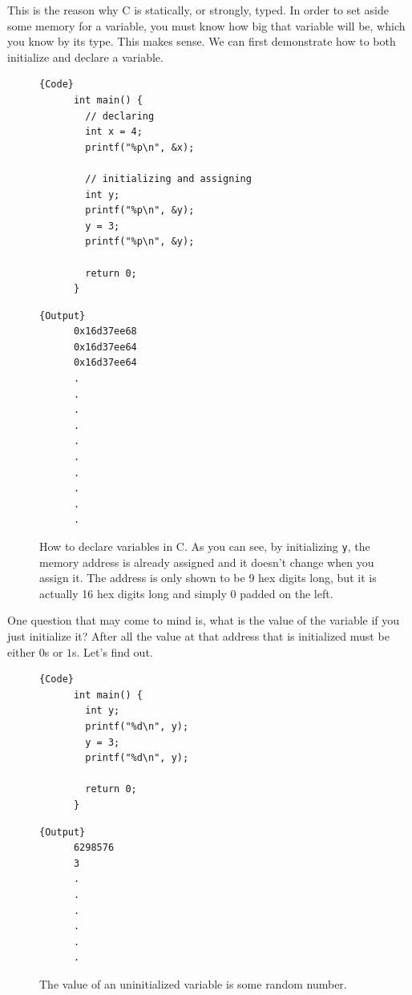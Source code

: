 \documentclass{article}
\begin{document}
  This is the reason why C is statically, or strongly, typed. In order to set aside some memory for a variable, you must know how big that variable will be, which you know by its type. This makes sense. We can first demonstrate how to both initialize and declare a variable. 

  \begin{figure}[H]
    \centering 
    \noindent\begin{minipage}{.5\textwidth}
    \begin{lstlisting}[]{Code}
      int main() {
        // declaring 
        int x = 4;   
        printf("%p\n", &x); 
        
        // initializing and assigning
        int y; 
        printf("%p\n", &y); 
        y = 3; 
        printf("%p\n", &y); 

        return 0; 
      }
    \end{lstlisting}
    \end{minipage}
    \hfill
    \begin{minipage}{.49\textwidth}
    \begin{lstlisting}[]{Output}
      0x16d37ee68
      0x16d37ee64
      0x16d37ee64 
      .
      .
      .
      .
      .
      .
      .
      .
      .
      .
    \end{lstlisting}
    \end{minipage}
    \caption{How to declare variables in C. As you can see, by initializing \texttt{y}, the memory address is already assigned and it doesn't change when you assign it. The address is only shown to be 9 hex digits long, but it is actually 16 hex digits long and simply 0 padded on the left. } 
    \label{fig:declaring_initializing_variables}
  \end{figure}

  One question that may come to mind is, what is the value of the variable if you just initialize it? After all the value at that address that is initialized must be either $0$s or $1$s. Let's find out. 

  \begin{figure}[H]
    \centering 
    \noindent\begin{minipage}{.5\textwidth}
    \begin{lstlisting}[]{Code}
      int main() { 
        int y; 
        printf("%d\n", y); 
        y = 3; 
        printf("%d\n", y); 

        return 0; 
      }
    \end{lstlisting}
    \end{minipage}
    \hfill
    \begin{minipage}{.49\textwidth}
    \begin{lstlisting}[]{Output}
      6298576 
      3
      .
      .
      .
      .
      .
      .
    \end{lstlisting}
    \end{minipage}
    \caption{The value of an uninitialized variable is some random number. } 
    \label{fig:uninitialized_variable}
  \end{figure}
\end{document}
